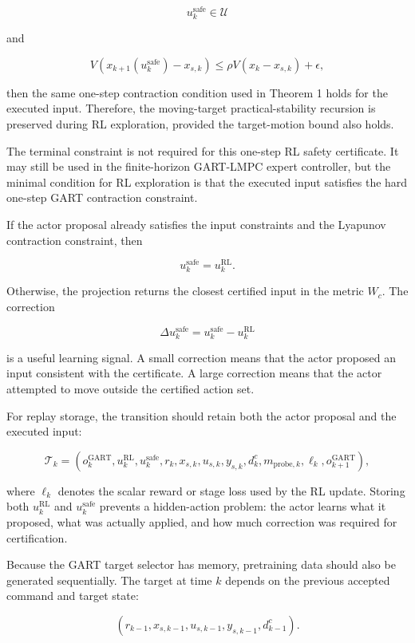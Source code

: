 \documentclass[11pt]{article}
\begin{document}
\[
u_k^{\mathrm{safe}}\in\mathcal U
\]

and

\[
V(x_{k+1}(u_k^{\mathrm{safe}})-x_{s,k})
\le
\rho V(x_k-x_{s,k})+\epsilon,
\]

then the same one-step contraction condition used in Theorem 1 holds for the executed input. Therefore, the moving-target practical-stability recursion is preserved during RL exploration, provided the target-motion bound also holds.

The terminal constraint is not required for this one-step RL safety certificate. It may still be used in the finite-horizon GART-LMPC expert controller, but the minimal condition for RL exploration is that the executed input satisfies the hard one-step GART contraction constraint.

If the actor proposal already satisfies the input constraints and the Lyapunov contraction constraint, then


\[
u_k^{\mathrm{safe}}=u_k^{\mathrm{RL}}.
\]

Otherwise, the projection returns the closest certified input in the metric $W_c$. The correction


\[
\Delta u_k^{\mathrm{safe}}
=
u_k^{\mathrm{safe}}-u_k^{\mathrm{RL}}
\]

is a useful learning signal. A small correction means that the actor proposed an input consistent with the certificate. A large correction means that the actor attempted to move outside the certified action set.


For replay storage, the transition should retain both the actor proposal and the executed input:


\[
\mathcal T_k
=
\left(
o_k^{\mathrm{GART}},
u_k^{\mathrm{RL}},
u_k^{\mathrm{safe}},
r_k,
x_{s,k},
u_{s,k},
y_{s,k},
d^c_k,
m_{\mathrm{probe},k},
\ell_k,
o_{k+1}^{\mathrm{GART}}
\right),
\]

where $\ell_k$ denotes the scalar reward or stage loss used by the RL update. Storing both $u_k^{\mathrm{RL}}$ and $u_k^{\mathrm{safe}}$ prevents a hidden-action problem: the actor learns what it proposed, what was actually applied, and how much correction was required for certification.


Because the GART target selector has memory, pretraining data should also be generated sequentially. The target at time $k$ depends on the previous accepted command and target state:


\[
(r_{k-1},x_{s,k-1},u_{s,k-1},y_{s,k-1},d^c_{k-1}).
\]
\end{document}
